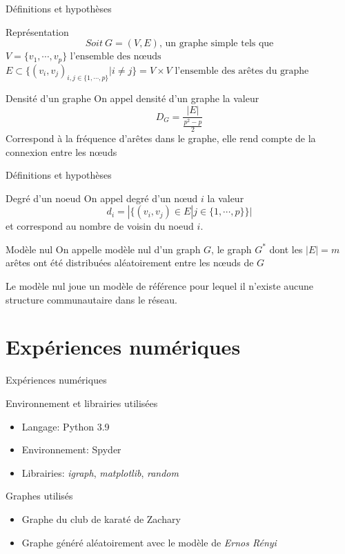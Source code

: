 \documentclass[11pt]{beamer}
\begin{document}
	\begin{frame}{Définitions et hypothèses}
		\scriptsize
		\begin{block}{Représentation}
			\[
			Soit~G = (V,E)\text{, un graphe simple tels que}
			\]
			$V = \{v_1, \cdots, v_p\} \text{ l'ensemble des nœuds }$
			$E \subset{\{ (v_i,v_j)_{i,j \in \{1,\cdots,p\}}| i \neq j \}} = V\times V \text{ l'ensemble des arêtes du graphe}$
		\end{block}
		\scriptsize
		\begin{block}{Densité d'un graphe}
			On appel densité d'un graphe la valeur
			\[
			D_G = \frac{|E|}{\frac{p^2-p}{2}}
			\]
			Correspond à la fréquence d'arêtes dans le graphe, elle rend compte de la connexion entre les nœuds
		\end{block}
	\end{frame}
	\begin{frame}{Définitions et hypothèses}
		\small
		\begin{block}{Degré d'un noeud}
			On appel degré d'un nœud $i$ la valeur 
			\[
			d_i = |\{(v_i,v_j) \in E | j \in {\{1,\cdots,p\}} \}| 
			\]
			et correspond au nombre de voisin du noeud $i$.
		\end{block}
		\small
		\begin{block}{Modèle nul}
			On appelle modèle nul d'un graph $G$, le graph $G^*$ dont les $|E| = m$ arêtes ont été distribuées aléatoirement entre les nœuds de $G$\newline

			Le modèle nul joue un modèle de référence pour lequel il n'existe aucune structure communautaire dans le réseau.
		\end{block}
	\end{frame}
	
	
	\section{Expériences numériques}
	
	\begin{frame}{Expériences numériques}
		\begin{block}{Environnement et librairies utilisées}
			\begin{itemize}
				\item Langage: Python 3.9 \\
				\item Environnement: Spyder \\
				\item Librairies: \textit{igraph}, \textit{matplotlib}, \textit{random}
			\end{itemize} 
		\end{block}
		\begin{block}{Graphes utilisés}
			\begin{itemize}
				\item Graphe du club de karaté de Zachary \\
				\item Graphe généré aléatoirement avec le modèle de \textit{Ernos Rényi}
			\end{itemize}
		\end{block}
	\end{frame}
	
\end{document}
